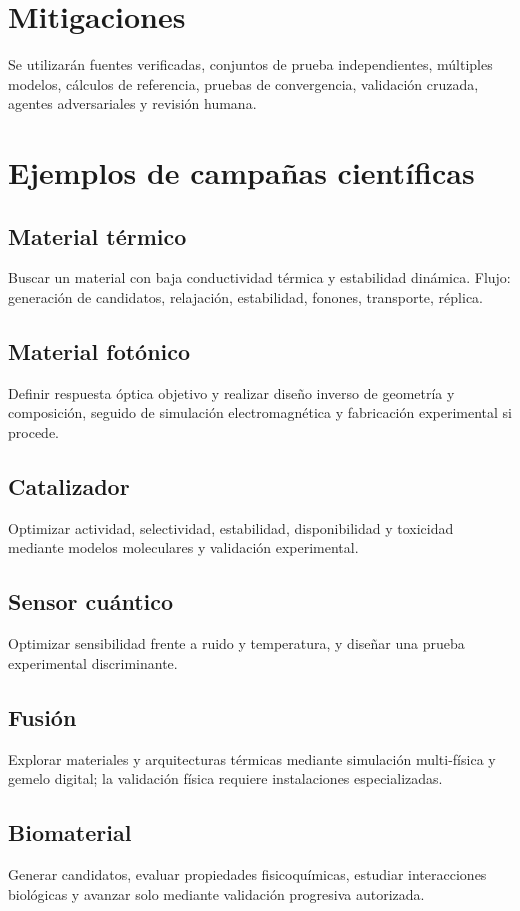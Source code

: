 \documentclass[11pt,a4paper]{article}
\begin{document}
\section{Mitigaciones}
Se utilizarán fuentes verificadas, conjuntos de prueba independientes, múltiples modelos, cálculos de referencia, pruebas de convergencia, validación cruzada, agentes adversariales y revisión humana.

\section{Ejemplos de campañas científicas}
\subsection{Material térmico}
Buscar un material con baja conductividad térmica y estabilidad dinámica. Flujo: generación de candidatos, relajación, estabilidad, fonones, transporte, réplica.
\subsection{Material fotónico}
Definir respuesta óptica objetivo y realizar diseño inverso de geometría y composición, seguido de simulación electromagnética y fabricación experimental si procede.
\subsection{Catalizador}
Optimizar actividad, selectividad, estabilidad, disponibilidad y toxicidad mediante modelos moleculares y validación experimental.
\subsection{Sensor cuántico}
Optimizar sensibilidad frente a ruido y temperatura, y diseñar una prueba experimental discriminante.
\subsection{Fusión}
Explorar materiales y arquitecturas térmicas mediante simulación multi-física y gemelo digital; la validación física requiere instalaciones especializadas.
\subsection{Biomaterial}
Generar candidatos, evaluar propiedades fisicoquímicas, estudiar interacciones biológicas y avanzar solo mediante validación progresiva autorizada.
\end{document}
